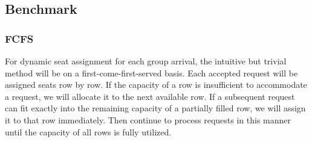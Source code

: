










\subsection{Benchmark}
 

\subsubsection{FCFS}\label{largest_pattern}
For dynamic seat assignment for each group arrival, the intuitive but trivial method will be on a first-come-first-served basis. Each accepted request will be assigned seats row by row. If the capacity of a row is insufficient to accommodate a request, we will allocate it to the next available row. If a subsequent request can fit exactly into the remaining capacity of a partially filled row, we will assign it to that row immediately. Then continue to process requests in this manner until the capacity of all rows is fully utilized.


